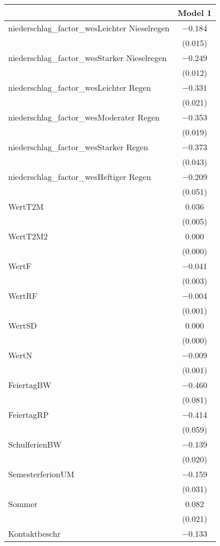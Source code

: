 \begin{table}
\centering
\begin{tabular}[t]{lc}
\toprule
  & Model 1\\
\midrule
niederschlag\_factor\_wesLeichter Nieselregen & \num{-0.184}\\
 & (\num{0.015})\\
niederschlag\_factor\_wesStarker Nieselregen & \num{-0.249}\\
 & (\num{0.012})\\
niederschlag\_factor\_wesLeichter Regen & \num{-0.331}\\
 & \vphantom{1} (\num{0.021})\\
niederschlag\_factor\_wesModerater Regen & \num{-0.353}\\
 & (\num{0.019})\\
niederschlag\_factor\_wesStarker Regen & \num{-0.373}\\
 & (\num{0.043})\\
niederschlag\_factor\_wesHeftiger Regen & \num{-0.209}\\
 & (\num{0.051})\\
WertT2M & \num{0.036}\\
 & (\num{0.005})\\
WertT2M2 & \num{0.000}\\
 & \vphantom{1} (\num{0.000})\\
WertF & \num{-0.041}\\
 & (\num{0.003})\\
WertRF & \num{-0.004}\\
 & \vphantom{1} (\num{0.001})\\
WertSD & \num{0.000}\\
 & (\num{0.000})\\
WertN & \num{-0.009}\\
 & (\num{0.001})\\
FeiertagBW & \num{-0.460}\\
 & (\num{0.081})\\
FeiertagRP & \num{-0.414}\\
 & (\num{0.059})\\
SchulferienBW & \num{-0.139}\\
 & (\num{0.020})\\
SemesterferionUM & \num{-0.159}\\
 & (\num{0.031})\\
Sommer & \num{0.082}\\
 & (\num{0.021})\\
Kontaktbeschr & \num{-0.133}\\

\end{tabular}
\end{table}
